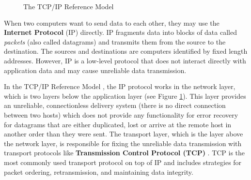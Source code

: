 
\begin{figure}[H]
    \centering
    \caption{The TCP/IP Reference Model \cite{tcpip}}
    \label{fig:tcpip}
\end{figure}

When two computers want to send data to each other, they may use the \textbf{Internet Protocol} (IP) \cite{rfc791} directly. IP fragments data into blocks of data called \textit{packets} (also called datagrams) and transmits them from the source to the destination. The sources and destinations are computers identified by fixed length addresses. However, IP is a low-level protocol that does not interact directly with application data and may cause unreliable data transmission.

In the TCP/IP Reference Model \cite{tcpip}, the IP protocol works in the network layer, which is two layers below the application layer (see Figure \ref{fig:tcpip}). This layer provides an unreliable, connectionless delivery system (there is no direct connection between two hosts) which does not provide any functionality for error recovery for datagrams that are either duplicated, lost or arrive at the remote host in another order than they were sent. The transport layer, which is the layer above the network layer, is responsible for fixing the unreliable data transmission with transport protocols like \textbf{Transmission Control Protocol (TCP)} \cite{rfc793}. TCP is the most commonly used transport protocol on top of IP and includes strategies for packet ordering, retransmission, and maintaining data integrity.

